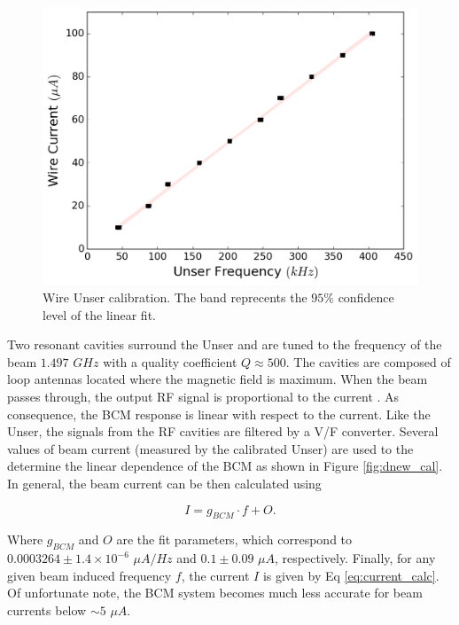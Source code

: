 \documentclass[final,5p,times,twocolumn]{elsarticle}
\begin{document}
\begin{figure}[!h]
    \centering
    \includegraphics[width=\linewidth]{images/unser_calibration.pdf}
    \caption{Wire Unser calibration. The band reprecents the $95\%$ confidence level of the linear fit.}
    \label{fig:unser_cal}
\end{figure}
  
Two resonant cavities surround the Unser and are tuned to the frequency of the beam $1.497$ $GHz$ with a quality coefficient $Q \approx 500$. The cavities are composed of loop antennas located where the magnetic field is maximum. When the beam passes through, the output RF signal is proportional to the current \cite{denard}. As consequence, the BCM response is linear with respect to the current. Like the Unser, the signals from the RF cavities are filtered by a V/F converter. Several values of beam current (measured by the calibrated Unser) are used to the determine the linear dependence of the BCM as shown in Figure \ref{fig:dnew_cal}. In general, the beam current can be then calculated using

\begin{equation}
I = g_{BCM}\cdot f+O.
\label{eq:current_calc}
\end{equation}

\noindent Where $g_{BCM}$ and $O$ are the fit parameters, which correspond to $0.0003264 \pm 1.4 \times 10^{-6}$ $\mu A/Hz$ and $0.1 \pm 0.09$  $\mu A$, respectively. Finally, for any given beam induced frequency $f$, the current $I$ is given by Eq \ref{eq:current_calc}. Of unfortunate note, the BCM system becomes much less accurate for beam currents below $\sim 5$ $\mu A$.
  
\end{document}
